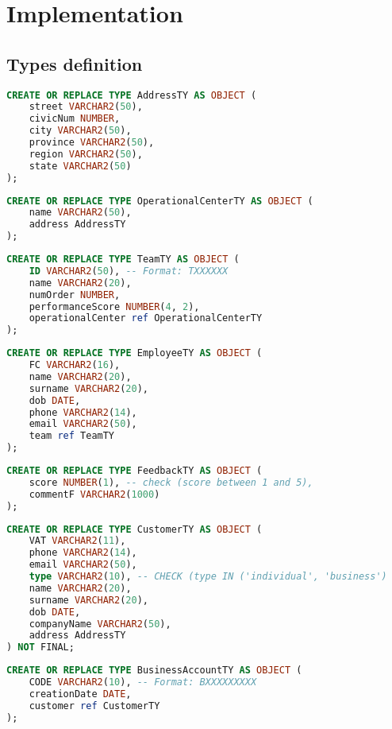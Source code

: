 \chapter{Implementation}

\section{Types definition}
\begin{lstlisting}[language=SQL]
CREATE OR REPLACE TYPE AddressTY AS OBJECT (
    street VARCHAR2(50),
    civicNum NUMBER,
    city VARCHAR2(50),
    province VARCHAR2(50),
    region VARCHAR2(50),
    state VARCHAR2(50)
);
\end{lstlisting}

\begin{lstlisting}[language=SQL]
CREATE OR REPLACE TYPE OperationalCenterTY AS OBJECT (
    name VARCHAR2(50),
    address AddressTY
);
\end{lstlisting}

\begin{lstlisting}[language=SQL]
CREATE OR REPLACE TYPE TeamTY AS OBJECT (
    ID VARCHAR2(50), -- Format: TXXXXXX
    name VARCHAR2(20),
    numOrder NUMBER,
    performanceScore NUMBER(4, 2),
    operationalCenter ref OperationalCenterTY
);
\end{lstlisting}

\begin{lstlisting}[language=SQL]
CREATE OR REPLACE TYPE EmployeeTY AS OBJECT (
    FC VARCHAR2(16),
    name VARCHAR2(20),
    surname VARCHAR2(20),
    dob DATE,
    phone VARCHAR2(14),
    email VARCHAR2(50),
    team ref TeamTY
);
\end{lstlisting}

\begin{lstlisting}[language=SQL]    
CREATE OR REPLACE TYPE FeedbackTY AS OBJECT (
    score NUMBER(1), -- check (score between 1 and 5),
    commentF VARCHAR2(1000)
);
\end{lstlisting}

\begin{lstlisting}[language=SQL]    
CREATE OR REPLACE TYPE CustomerTY AS OBJECT (
    VAT VARCHAR2(11),
    phone VARCHAR2(14),
    email VARCHAR2(50),
    type VARCHAR2(10), -- CHECK (type IN ('individual', 'business')
    name VARCHAR2(20),
    surname VARCHAR2(20),
    dob DATE,
    companyName VARCHAR2(50),
    address AddressTY
) NOT FINAL;
\end{lstlisting}

\begin{lstlisting}[language=SQL]    
CREATE OR REPLACE TYPE BusinessAccountTY AS OBJECT (
    CODE VARCHAR2(10), -- Format: BXXXXXXXXX
    creationDate DATE,
    customer ref CustomerTY
);
\end{lstlisting}

